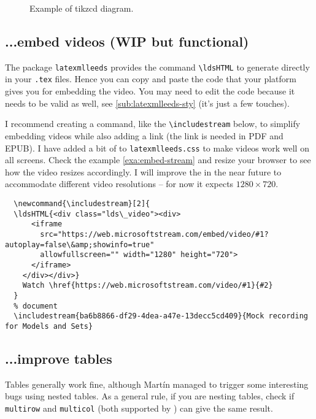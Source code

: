 \documentclass[a4paper]{article}
\def\ltxinline{\lstinline[style=latexml,frame=none]}
\theoremstyle{definition}
\begin{document}
\begin{figure}
  \begin{center}
  \end{center}
  \caption{Example of tikzcd diagram.}
  \label{fig:tikzcd-example}
\end{figure}

\subsection{...embed videos (WIP but functional)}
The package \verb|latexmlleeds| provides the command \ltxinline|\ldsHTML| to generate \HTML{} directly in your \verb|.tex| files. Hence you can copy and paste the \HTML{} code that your platform gives you for embedding the video. You may need to edit the \HTML{} code because it needs to be valid \XML{} as well, see \autoref{sub:latexmlleeds-sty} (it's just a few touches).

I recommend creating a command, like the \ltxinline|\includestream| below, to simplify embedding videos while also adding a link (the link is needed in PDF and EPUB). I have added a bit of \CSS{} to \verb|latexmlleeds.css| to make videos work well on all screens. Check the example \autoref{exa:embed-stream} and resize your browser to see how the video resizes accordingly. I will improve the \CSS{} in the near future to accommodate different video resolutions -- for now it expects $1280 \times 720$.
\begin{lstlisting}[style=latexml]
  % preamble
  \newcommand{\includestream}[2]{
  \ldsHTML{<div class="lds\_video"><div>
      <iframe
        src="https://web.microsoftstream.com/embed/video/#1?autoplay=false\&amp;showinfo=true"
        allowfullscreen="" width="1280" height="720">
      </iframe>
    </div></div>}
    Watch \href{https://web.microsoftstream.com/video/#1}{#2}
  }
  % document
  \includestream{ba6b8866-df29-4dea-a47e-13decc5cd409}{Mock recording for Models and Sets}
\end{lstlisting}

\subsection{...improve tables}
Tables generally work fine, although Mart\'in managed to trigger some interesting bugs using nested tables. As a general rule, if you are nesting tables, check if \verb|multirow| and \verb|multicol| (both supported by \LaTeXML{}) can give the same result.
\end{document}
